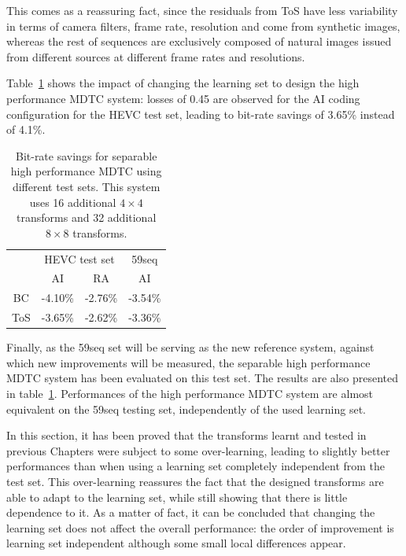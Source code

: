 \documentclass[11pt,a4paper,openright,twoside]{book}
\numberwithin{equation}{section} %
\numberwithin{figure}{section} %
\numberwithin{table}{section} %
\begin{document}
This comes as a reassuring fact, since the residuals from ToS have less
variability in terms of camera filters, frame rate, resolution and come from
synthetic images, whereas the rest of sequences are exclusively composed of
natural images issued from different sources at different frame rates and
resolutions.

Table~\ref{tab:cross_bdrate_learn} shows the impact of changing the
learning set to design the high performance \ac{MDTC} system: losses of 0.45
are observed for the \ac{AI} coding configuration for the \ac{HEVC} test set,
leading to bit-rate savings of 3.65\% instead of 4.1\%.

\begin{table}[tb]
	\centering
	\small
	\begin{tabular}{c|cc|c}
		& \multicolumn{2}{c|}{\acs{HEVC} test set} & 59seq \\
		\diagbox{Learn}{Test}
		& \acs{AI} & \acs{RA} & \acs{AI} \\
		\hline\hline
		BC  & -4.10\% & -2.76\% & -3.54\% \\
		ToS & -3.65\% & -2.62\% & -3.36\% \\
	\end{tabular}
	\caption[Bit-rate savings for separable high performance \acs{MDTC} using
	different test sets]
	{Bit-rate savings for separable high performance \acs{MDTC} using
	different test sets. This system uses 16 additional $4\times4$ transforms
	and 32 additional $8\times8$ transforms.}
	\label{tab:cross_bdrate_learn}
\end{table}

Finally, as the 59seq set will be serving as the new reference system, against
which new improvements will be measured, the separable high performance
\ac{MDTC} system has been evaluated on this test set.
The results are also presented in table~\ref{tab:cross_bdrate_learn}.
Performances of the high performance \ac{MDTC} system are almost equivalent on
the 59seq testing set, independently of the used learning set.

In this section, it has been proved that the transforms learnt and tested in
previous Chapters were subject to some over-learning, leading to slightly
better performances than when using a learning set completely independent from
the test set.
This over-learning reassures the fact that the designed transforms are able to
adapt to the learning set, while still showing that there is little dependence
to it.
As a matter of fact, it can be concluded that changing the learning set does
not affect the overall performance:
the order of improvement is learning set independent although some small local
differences appear.
\end{document}
